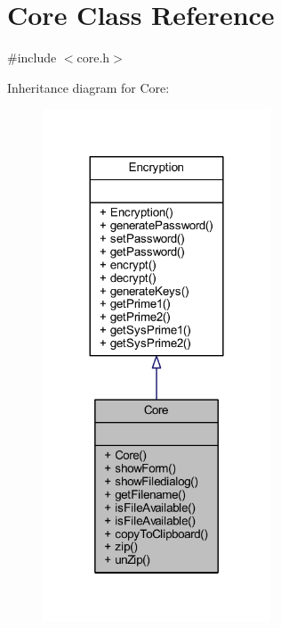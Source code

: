 \hypertarget{class_core}{}\section{Core Class Reference}
\label{class_core}


{\ttfamily \#include $<$core.\+h$>$}



Inheritance diagram for Core\+:
\nopagebreak
\begin{figure}[H]
\begin{center}
\leavevmode
\includegraphics[width=192pt]{class_core__inherit__graph}
\end{center}
\end{figure}



